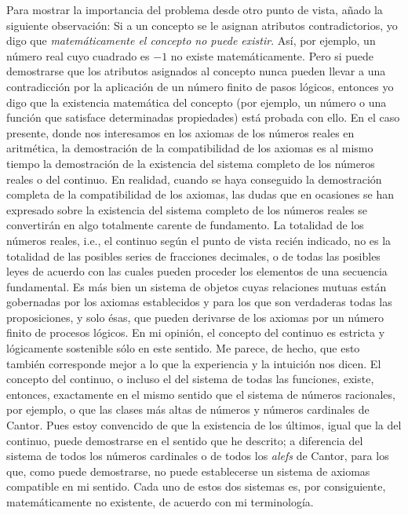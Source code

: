 \documentclass[a4paper, 12pt]{article}
\begin{document}
Para mostrar la importancia del problema desde otro punto de vista, añado la siguiente observación: Si a un concepto se le asignan atributos contradictorios, yo digo que \textit{matemáticamente el concepto no puede existir}. Así, por ejemplo, un número real cuyo cuadrado es $-1$ no existe matemáticamente. Pero si puede demostrarse que los atributos asignados al concepto nunca pueden llevar a una contradicción por la aplicación de un número finito de pasos lógicos, entonces yo digo que la existencia matemática del concepto (por ejemplo, un número o una función que satisface determinadas propiedades) está probada con ello. En el caso presente, donde nos interesamos en los axiomas de los números reales en aritmética, la demostración de la compatibilidad de los axiomas es al mismo tiempo la demostración de la existencia del sistema completo de los números reales o del continuo. En realidad, cuando se haya conseguido la demostración completa de la compatibilidad de los axiomas, las dudas que en ocasiones se han expresado sobre la existencia del sistema completo de los números reales se convertirán en algo totalmente carente de fundamento. La totalidad de los números reales, i.e., el continuo según el punto de vista recién indicado, no es la totalidad de las posibles series de fracciones decimales, o de todas las posibles leyes de acuerdo con las cuales pueden proceder los elementos de una secuencia fundamental. Es más bien un sistema de objetos cuyas relaciones mutuas están gobernadas por los axiomas establecidos y para los que son verdaderas todas las proposiciones, y solo ésas, que pueden derivarse de los axiomas por un número finito de procesos lógicos. En mi opinión, el concepto del continuo es estricta y lógicamente sostenible sólo en este sentido. Me parece, de hecho, que esto también corresponde mejor a lo que la experiencia y la intuición nos dicen. El concepto del continuo, o incluso el del sistema de todas las funciones, existe, entonces, exactamente en el mismo sentido que el sistema de números racionales, por ejemplo, o que las clases más altas de números y números cardinales de Cantor. Pues estoy convencido de que la existencia de los últimos, igual que la del continuo, puede demostrarse en el sentido que he descrito; a diferencia del sistema de todos los números cardinales o de todos los \textit{alefs} de Cantor, para los que, como puede demostrarse, no puede establecerse un sistema de axiomas compatible en mi sentido. Cada uno de estos dos sistemas es, por consiguiente, matemáticamente no existente, de acuerdo con mi terminología. 
\end{document}
